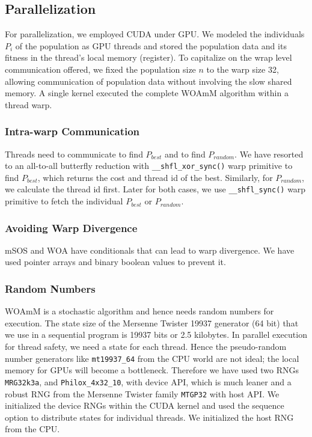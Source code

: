 \documentclass[conference]{IEEEtran}
\begin{document}
\subsection{Parallelization}

For parallelization, we employed CUDA under GPU. 
We modeled the individuals $P_i$ of the population as GPU threads and stored the population data and its fitness in the thread’s local memory (register). 
To capitalize on the wrap level communication offered, we fixed the population size $n$ to the warp size 32, allowing communication of population data without involving the slow shared memory. 
A single kernel executed the complete WOAmM algorithm within a thread warp.

\subsubsection{Intra-warp Communication}

Threads need to communicate to find $P_{best}$ and to find $P_{random}$. 
We have resorted to an all-to-all butterfly reduction with \lstinline{__shfl_xor_sync()} warp primitive to find $P_{best}$, which returns the cost and thread id of the best. 
Similarly, for $P_{random}$, we calculate the thread id first. 
Later for both cases, we use \lstinline{__shfl_sync()} warp primitive to fetch the individual $P_{best}$ or $P_{random}$.

\subsubsection{Avoiding Warp Divergence}

mSOS and WOA have conditionals that can lead to warp divergence. 
We have used pointer arrays and binary boolean values to prevent it.

\subsubsection{Random Numbers}

WOAmM is a stochastic algorithm and hence needs random numbers for execution. 
The state size of the Mersenne Twister 19937 generator (64 bit) that we use in a sequential program is 19937 bits or 2.5 kilobytes. 
In parallel execution for thread safety, we need a state for each thread. 
Hence the pseudo-random number generators like \lstinline{mt19937_64} from the CPU world are not ideal; the local memory for GPUs will become a bottleneck. 
Therefore we have used two RNGs \lstinline{MRG32k3a}, and \lstinline{Philox_4x32_10}, with device API, which is much leaner and a  robust RNG from the Mersenne Twister family \lstinline{MTGP32} with host API.
We initialized the device RNGs within the CUDA kernel and used the sequence option to distribute states for individual threads.  
We initialized the host RNG from the CPU.
\end{document}
